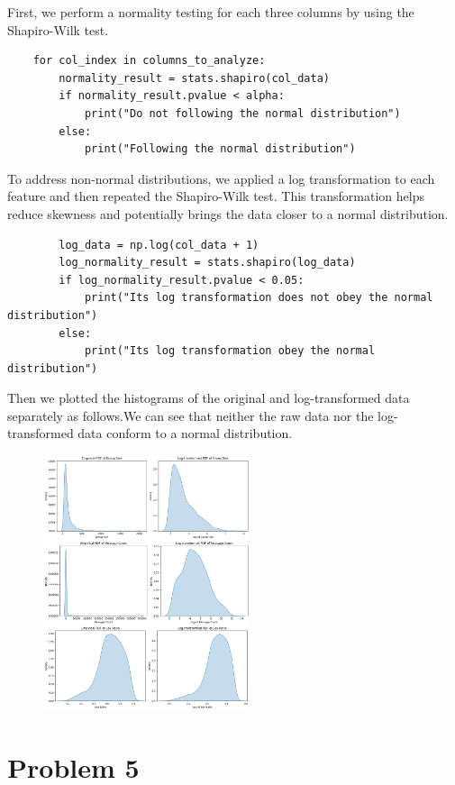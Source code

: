 \documentclass[12pt]{article}
\begin{document}
First, we perform a normality testing for each three columns by using the Shapiro-Wilk test. 
\begin{verbatim}
    for col_index in columns_to_analyze:
        normality_result = stats.shapiro(col_data)
        if normality_result.pvalue < alpha:
            print("Do not following the normal distribution")
        else:
            print("Following the normal distribution")
\end{verbatim}

To address non-normal distributions, we applied a log transformation to each feature and then repeated the Shapiro-Wilk test. This transformation helps reduce skewness and potentially brings the data closer to a normal distribution.
\begin{verbatim}
        log_data = np.log(col_data + 1)  
        log_normality_result = stats.shapiro(log_data)
        if log_normality_result.pvalue < 0.05:
            print("Its log transformation does not obey the normal distribution")
        else:
            print("Its log transformation obey the normal distribution")
\end{verbatim}

Then we plotted the histograms of the original and log-transformed data separately as follows.We can see that neither the raw data nor the log-transformed data conform to a normal distribution.

\begin{figure}[h]
    \centering
    \includegraphics[width=0.54\textwidth]{image/output3.png}  
    \label{fig:PDF of Original and Log-transformed Data}
\end{figure}
\newpage

\section*{Problem 5}
\end{document}
